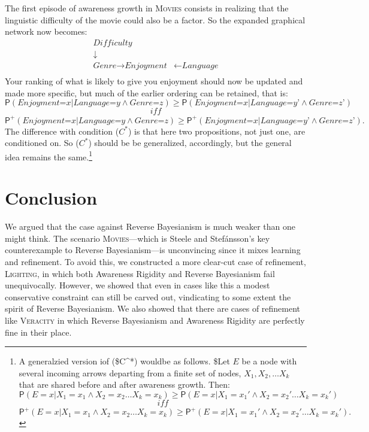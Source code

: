 \documentclass[
  11pt,
  dvipsnames,enabledeprecatedfontcommands]{scrartcl}
\newcommand{\pr}[1]{\ensuremath{\mathsf{P}(#1)}}
\newcommand{\ppr}[2]{\ensuremath{\mathsf{P}^{#1}(#2)}}
\begin{document}
The first episode of awareness growth in \textsc{Movies} consists in
realizing that the linguistic difficulty of the movie could also be a
factor. So the expanded graphical network now becomes: \begin{align*}
\textit{Difficulty} &\\
\downarrow \\
\textit{Genre} \rightarrow \textit{Enjoyment} &\leftarrow \textit{Language}\\
\end{align*} \noindent Your ranking of what is likely to give you
enjoyment should now be updated and made more specific, but much of the
earlier ordering can be retained, that is:
\[\pr{\textit{Enjoyment=x} \vert \textit{Language=y} \wedge \textit{Genre=z}} \geq \pr{\textit{Enjoyment=x} \vert \textit{Language=y'} \wedge \textit{Genre=z'}}\]
\[\textit{ iff }\]
\[\ppr{+}{\textit{Enjoyment=x} \vert \textit{Language=y} \wedge \textit{Genre=z}} \geq \ppr{+}{\textit{Enjoyment=x} \vert \textit{Language=y'} \wedge \textit{Genre=z'}}.\]
The difference with condition (\(C^*\)) is that here two propositions,
not just one, are conditioned on. So (\(C^*\)) should be be generalized,
accordingly, but the general idea remains the same.\footnote{A
  generalzied version iof (\$C\^{}*) wouldbe as follows. \$Let \(E\) be
  a node with several incoming arrows departing from a finite set of
  nodes, \(X_1, X_2, \dots X_k\) that are shared before and after
  awareness growth. Then:
  \[\pr{E=x \vert X_1=x_1 \wedge X_2=x_2 \dots X_k=x_k} \geq \pr{E=x \vert X_1=x_1' \wedge X_2=x_2' \dots X_k=x_k'}\]
  \[\textit{ iff }\]
  \[\ppr{+}{E=x \vert X_1=x_1 \wedge X_2=x_2 \dots X_k=x_k} \geq \ppr{+}{E=x \vert X_1=x_1' \wedge X_2=x_2' \dots X_k=x_k'}.\]}

\hypertarget{conclusion}{%
\section{Conclusion}\label{conclusion}}

We argued that the case against Reverse Bayesianism is much weaker than
one might think. The scenario \textsc{Movies}---which is Steele and
Stefánsson's key counterexample to Reverse Bayesianism---is unconvincing
since it mixes learning and refinement. To avoid this, we constructed a
more clear-cut case of refinement, \textsc{Lighting}, in which both
Awareness Rigidity and Reverse Bayesianism fail unequivocally. However,
we showed that even in cases like this a modest conservative constraint
can still be carved out, vindicating to some extent the spirit of
Reverse Bayesianism. We also showed that there are cases of refinement
like \textsc{Veracity} in which Reverse Bayesianism and Awareness
Rigidity are perfectly fine in their place.
\end{document}

